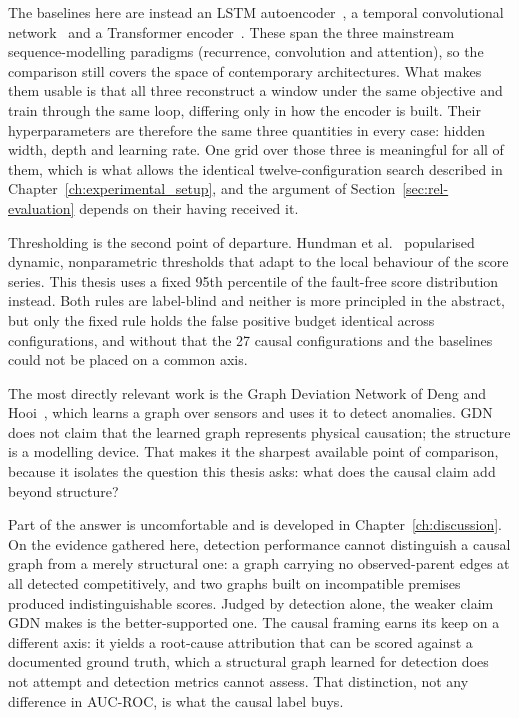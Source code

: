 The baselines here are instead an LSTM autoencoder~\cite{hochreiter1997lstm}, a temporal convolutional network~\cite{bai2018tcn} and a Transformer encoder~\cite{vaswani2017attention}. These span the three mainstream sequence-modelling paradigms (recurrence, convolution and attention), so the comparison still covers the space of contemporary architectures. What makes them usable is that all three reconstruct a window under the same objective and train through the same loop, differing only in how the encoder is built. Their hyperparameters are therefore the same three quantities in every case: hidden width, depth and learning rate. One grid over those three is meaningful for all of them, which is what allows the identical twelve-configuration search described in Chapter~\ref{ch:experimental_setup}, and the argument of Section~\ref{sec:rel-evaluation} depends on their having received it.

Thresholding is the second point of departure. Hundman et al.~\cite{hundman2018telemanom} popularised dynamic, nonparametric thresholds that adapt to the local behaviour of the score series. This thesis uses a fixed 95th percentile of the fault-free score distribution instead. Both rules are label-blind and neither is more principled in the abstract, but only the fixed rule holds the false positive budget identical across configurations, and without that the 27 causal configurations and the baselines could not be placed on a common axis.

The most directly relevant work is the Graph Deviation Network of Deng and Hooi~\cite{deng2021gdn}, which learns a graph over sensors and uses it to detect anomalies. GDN does not claim that the learned graph represents physical causation; the structure is a modelling device. That makes it the sharpest available point of comparison, because it isolates the question this thesis asks: what does the causal claim add beyond structure?

Part of the answer is uncomfortable and is developed in Chapter~\ref{ch:discussion}. On the evidence gathered here, detection performance cannot distinguish a causal graph from a merely structural one: a graph carrying no observed-parent edges at all detected competitively, and two graphs built on incompatible premises produced indistinguishable scores. Judged by detection alone, the weaker claim GDN makes is the better-supported one. The causal framing earns its keep on a different axis: it yields a root-cause attribution that can be scored against a documented ground truth, which a structural graph learned for detection does not attempt and detection metrics cannot assess. That distinction, not any difference in AUC-ROC, is what the causal label buys.

